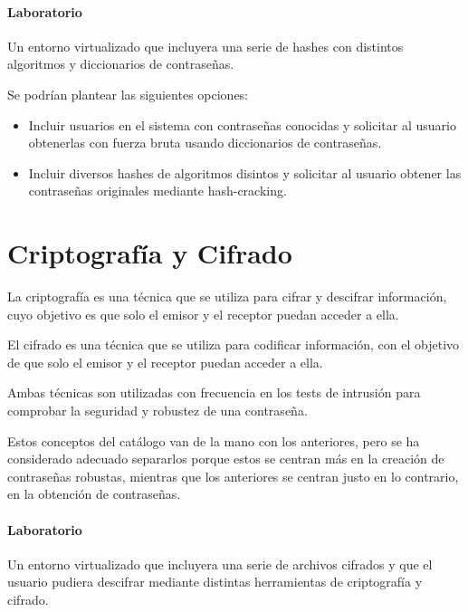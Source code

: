             \paragraph{Laboratorio}

                Un entorno virtualizado que incluyera una serie de hashes con distintos algoritmos y diccionarios de contraseñas.

                Se podrían plantear las siguientes opciones:
                
                \begin{itemize}
                    \item Incluir usuarios en el sistema con contraseñas conocidas y solicitar al usuario obtenerlas con fuerza bruta usando diccionarios de contraseñas.
                    \item Incluir diversos hashes de algoritmos disintos y solicitar al usuario obtener las contraseñas originales mediante hash-cracking.
                \end{itemize}


        \section{Criptografía y Cifrado}

            La criptografía es una técnica que se utiliza para cifrar y descifrar información, cuyo objetivo es que solo el emisor y el receptor puedan acceder a ella.

            El cifrado es una técnica que se utiliza para codificar información, con el objetivo de que solo el emisor y el receptor puedan acceder a ella.

            Ambas técnicas son utilizadas con frecuencia en los tests de intrusión para comprobar la seguridad y robustez de una contraseña.

            Estos conceptos del catálogo van de la mano con los anteriores, pero se ha considerado adecuado separarlos porque estos se centran más en la creación de contraseñas robustas, mientras que los anteriores se centran justo en lo contrario, en la obtención de contraseñas. 

            \paragraph{Laboratorio}

                Un entorno virtualizado que incluyera una serie de archivos cifrados y que el usuario pudiera descifrar mediante distintas herramientas de criptografía y cifrado.

